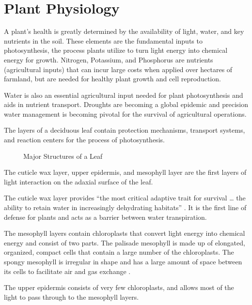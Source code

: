 \section{Plant Physiology}
A plant's health is greatly determined by the availability of light, water, and key nutrients in the soil.  These elements are the fundamental inputs to photosynthesis, the process plants utilize to turn light energy into chemical energy for growth.  Nitrogen, Potassium, and Phosphorus are nutrients (agricultural inputs) that can incur large costs when applied over hectares of farmland, but are needed for healthy plant growth and cell reproduction.

Water is also an essential agricultural input needed for plant photosynthesis and aids in nutrient transport.  Droughts are becoming a global epidemic and precision water management is becoming pivotal for the survival of agricultural operations.

The layers of a deciduous leaf contain protection mechanisms, transport systems, and reaction centers for the process of photosynthesis.
%
\begin{figure}[!htb]
    \begin{center}
    \end{center}
    \caption{Major Structures of a Leaf}
    \label{fig:polarization}
\end{figure}
%
The cuticle wax layer, upper epidermis, and mesophyll layer are the first layers of light interaction on the adaxial surface of the leaf.

The cuticle wax layer provides “the most critical adaptive trait for survival … the ability to retain water in increasingly dehydrating habitats” \cite{cuticle}.  It is the first line of defense for plants and acts as a barrier between water transpiration.

The mesophyll layers contain chloroplasts that convert light energy into chemical energy and consist of two parts. The palisade mesophyll is made up of elongated, organized, compact cells that contain a large number of the chloroplasts.  The spongy mesophyll is irregular in shape and has a large amount of space between its cells to facilitate air and gas exchange \cite{plantexchange}.

The upper epidermis consists of very few chloroplasts, and allows most of the light to pass through to the mesophyll layers.




